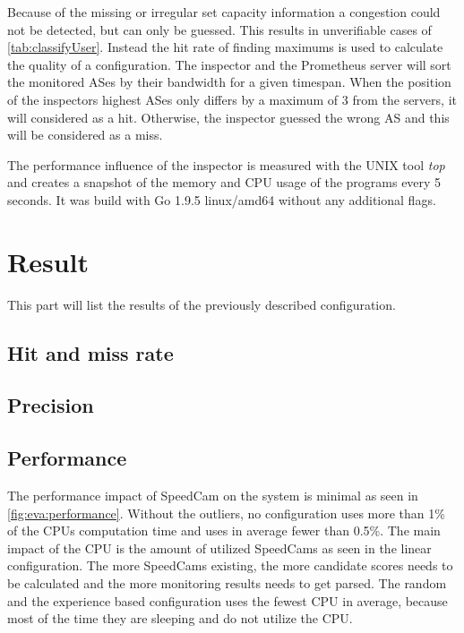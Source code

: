 \documentclass[thesis.tex]{subfiles}
\begin{document}
Because of the missing or irregular set capacity information a congestion could not be detected, but can only be guessed. This results in unverifiable cases of \autoref{tab:classifyUser}. Instead the hit rate of finding maximums is used to calculate the quality of a configuration. The inspector and the Prometheus server will sort the monitored ASes by their bandwidth for a given timespan. When the position of the inspectors highest ASes only differs by a maximum of 3 from the servers, it will considered as a hit. Otherwise, the inspector guessed the wrong AS and this will be considered as a miss. 

The performance influence of the inspector is measured with the UNIX tool \textit{top} and creates a snapshot of the memory and CPU usage of the programs every 5 seconds. It was build with Go 1.9.5 linux/amd64 without any additional flags.

\section{Result}
This part will list the results of the previously described configuration.

\subsection{Hit and miss rate}


\subsection{Precision}


\subsection{Performance}

The performance impact of SpeedCam on the system is minimal as seen in \autoref{fig:eva:performance}. Without the outliers, no configuration uses more than 1\% of the CPUs computation time and uses in average fewer than 0.5\%. The main impact of the CPU is the amount of utilized SpeedCams as seen in the linear configuration. The more SpeedCams existing, the more candidate scores needs to be calculated and the more monitoring results needs to get parsed. The random and the experience based configuration uses the fewest CPU in average, because most of the time they are sleeping and do not utilize the CPU.
\end{document}

